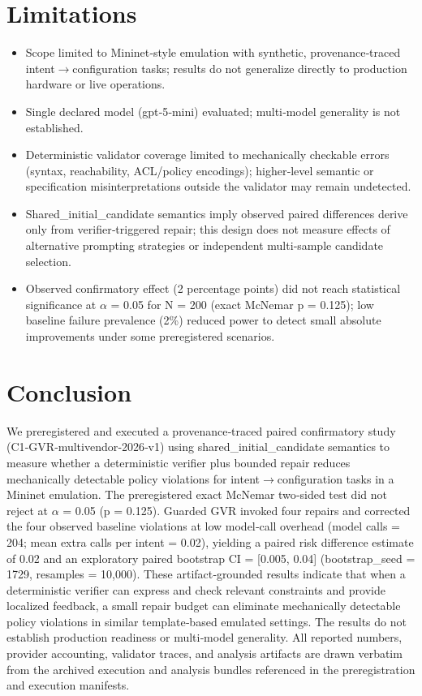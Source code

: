 \documentclass[conference]{IEEEtran}
\begin{document}
\section{Limitations}
\begin{itemize}
\item Scope limited to Mininet‑style emulation with synthetic, provenance‑traced intent\ensuremath{\rightarrow}configuration tasks; results do not generalize directly to production hardware or live operations.
\item Single declared model (gpt‑5‑mini) evaluated; multi‑model generality is not established.
\item Deterministic validator coverage limited to mechanically checkable errors (syntax, reachability, ACL/policy encodings); higher‑level semantic or specification misinterpretations outside the validator may remain undetected.
\item Shared\_initial\_candidate semantics imply observed paired differences derive only from verifier‑triggered repair; this design does not measure effects of alternative prompting strategies or independent multi‑sample candidate selection.
\item Observed confirmatory effect (2 percentage points) did not reach statistical significance at \ensuremath{\alpha} = 0.05 for N = 200 (exact McNemar p = 0.125); low baseline failure prevalence (2\%) reduced power to detect small absolute improvements under some preregistered scenarios.
\end{itemize}

\section{Conclusion}
We preregistered and executed a provenance‑traced paired confirmatory study (C1‑GVR‑multivendor‑2026‑v1) using shared\_initial\_candidate semantics to measure whether a deterministic verifier plus bounded repair reduces mechanically detectable policy violations for intent\ensuremath{\rightarrow}configuration tasks in a Mininet emulation. The preregistered exact McNemar two‑sided test did not reject at \ensuremath{\alpha} = 0.05 (p = 0.125). Guarded GVR invoked four repairs and corrected the four observed baseline violations at low model‑call overhead (model calls = 204; mean extra calls per intent = 0.02), yielding a paired risk difference estimate of 0.02 and an exploratory paired bootstrap CI = [0.005, 0.04] (bootstrap\_seed = 1729, resamples = 10,000). These artifact‑grounded results indicate that when a deterministic verifier can express and check relevant constraints and provide localized feedback, a small repair budget can eliminate mechanically detectable policy violations in similar template‑based emulated settings. The results do not establish production readiness or multi‑model generality. All reported numbers, provider accounting, validator traces, and analysis artifacts are drawn verbatim from the archived execution and analysis bundles referenced in the preregistration and execution manifests.
\end{document}
